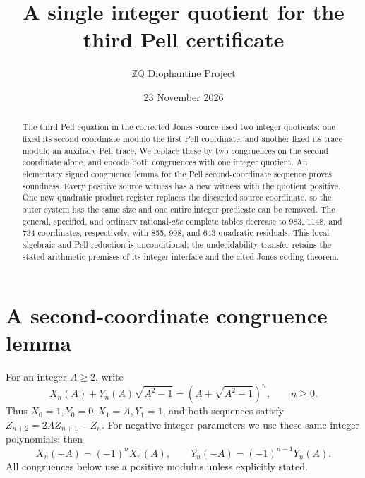 \documentclass[11pt]{article}
\title{A single integer quotient for the third Pell certificate}
\author{\(\mathbb Z\mathbb Q\) Diophantine Project}
\date{23 November 2026}
\begin{document}
\maketitle

\begin{abstract}
The third Pell equation in the corrected Jones source used two integer
quotients: one fixed its second coordinate modulo the first Pell
coordinate, and another fixed its trace modulo an auxiliary Pell
trace. We replace these by two congruences on the second coordinate
alone, and encode both congruences with one integer quotient. An
elementary signed congruence lemma for the Pell second-coordinate
sequence proves soundness. Every positive source witness has a new
witness with the quotient positive. One new quadratic product register
replaces the discarded source coordinate, so the outer system has the
same size and one entire integer predicate can be removed. The general,
specified, and ordinary rational-\(abc\) complete tables decrease to
983, 1148, and 734 coordinates, respectively, with 855, 998, and 643
quadratic residuals. This local algebraic and Pell
reduction is unconditional; the undecidability transfer retains the
stated arithmetic premises of its integer interface and the cited
Jones coding theorem.
\end{abstract}

\section{A second-coordinate congruence lemma}

For an integer \(A\ge2\), write
\[
 X_n(A)+Y_n(A)\sqrt{A^2-1}
       =(A+\sqrt{A^2-1})^n,\qquad n\ge0.
\]
Thus \(X_0=1,Y_0=0,X_1=A,Y_1=1\), and both sequences
satisfy \(Z_{n+2}=2AZ_{n+1}-Z_n\). For negative integer
parameters we use these same integer polynomials; then
\[
 X_n(-A)=(-1)^nX_n(A),\qquad
 Y_n(-A)=(-1)^{n-1}Y_n(A).
\]
All congruences below use a positive modulus unless explicitly stated.
\end{document}
